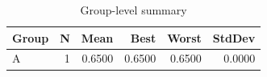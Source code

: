 \begin{table}[htbp]
\centering
\caption{Group-level summary}
\label{tab:group-summary}
\begin{tabular}{lrrrrr}
\toprule
\textbf{Group} & \textbf{N} & \textbf{Mean} & \textbf{Best} & \textbf{Worst} & \textbf{StdDev} \\
\midrule
A & 1 & 0.6500 & 0.6500 & 0.6500 & 0.0000 \\
\bottomrule
\end{tabular}
\end{table}